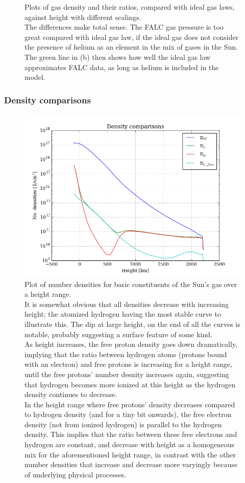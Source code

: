 \documentclass[11pt,a4paper,notitlepage]{article}
\begin{document}
\begin{figure}[H]
\caption{Plots of gas density and their ratios, compared with ideal gas laws, against height with different scalings. \\ The differences make total sense. The FALC gas pressure is too great compared with ideal gas law, if the ideal gas does not consider the presence of helium as an element in the mix of gases in the Sun. The green line in (b) then shows how well the ideal gas law approximates FALC data, as long as helium is included in the model.}
\end{figure}

\subsubsection{Density comparisons}

\begin{figure}[H]
\center

	\includegraphics[scale=0.42]{../figs/dens_comp.png}
	\caption{Plot of number densities for basic constituents of the Sun's gas over a height range.\\
	It is somewhat obvious that all densities decrease with increasing height; the atomized hydrogen having the most stable curve to illustrate this. The dip at large height, on the end of all the curves is notable, probably suggesting a surface feature of some kind.\\
	As height increases, the free proton density goes down dramatically, implying that the ratio between hydrogen atoms (protons bound with an electron) and free protons is increasing for a height range, until the free protons' number desnity increases again, suggesting that hydrogen becomes more ionized at this height as the hydrogen density continues to decrease.\\
	In the height range where free protons' density decreases compared to hydrogen density (and for a tiny bit onwards), the free electron density (not from ionized hydrogen) is parallel to the hydrogen density. This implies that the ratio between these free electrons and hydrogen are constant, and decrease with height as a homogeneous mix for the aforementioned height range, in contrast with the other number densities that increase and decrease more varyingly because of underlying physical processes.}
\end{figure}
\end{document}
